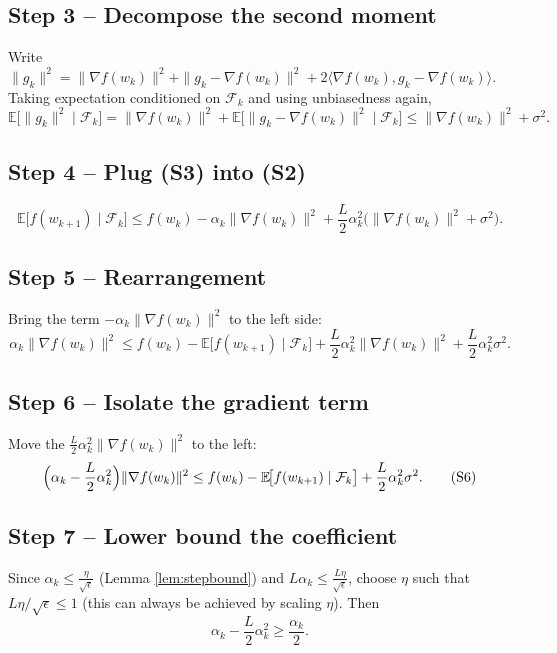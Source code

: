 \documentclass{article}
\newcommand{\E}{\mathbb{E}}
\begin{document}
\subsection*{Step 3 – Decompose the second moment}
Write $\|g_{k}\|^{2}= \|\nabla f(w_{k})\|^{2}+ \|g_{k}-\nabla f(w_{k})\|^{2}+2\langle\nabla f(w_{k}),g_{k}-\nabla f(w_{k})\rangle$.
Taking expectation conditioned on $\mathcal{F}_{k}$ and using unbiasedness again,
\[
\E\!\big[\|g_{k}\|^{2}\mid\mathcal{F}_{k}\big]
=\|\nabla f(w_{k})\|^{2}+\E\!\big[\|g_{k}-\nabla f(w_{k})\|^{2}\mid\mathcal{F}_{k}\big]
\le \|\nabla f(w_{k})\|^{2}+\sigma^{2}.
\tag{S3}
\]

\subsection*{Step 4 – Plug (S3) into (S2)}
\[
\E\!\big[f(w_{k+1})\mid\mathcal{F}_{k}\big]
\le f(w_{k})-\alpha_{k}\|\nabla f(w_{k})\|^{2}
+\frac{L}{2}\alpha_{k}^{2}\big(\|\nabla f(w_{k})\|^{2}+\sigma^{2}\big).
\tag{S4}
\]

\subsection*{Step 5 – Rearrangement}
Bring the term $-\alpha_{k}\|\nabla f(w_{k})\|^{2}$ to the left side:
\[
\alpha_{k}\|\nabla f(w_{k})\|^{2}
\le f(w_{k})-\E\!\big[f(w_{k+1})\mid\mathcal{F}_{k}\big]
+\frac{L}{2}\alpha_{k}^{2}\|\nabla f(w_{k})\|^{2}
+\frac{L}{2}\alpha_{k}^{2}\sigma^{2}.
\tag{S5}
\]

\subsection*{Step 6 – Isolate the gradient term}
Move the $ \frac{L}{2}\alpha_{k}^{2}\|\nabla f(w_{k})\|^{2}$ to the left:
\[
\Bigl(\alpha_{k}-\frac{L}{2}\alpha_{k}^{2}\Bigr)\|\nabla f(w_{k})\|^{2}
\le f(w_{k})-\E\!\big[f(w_{k+1})\mid\mathcal{F}_{k}\big]
+\frac{L}{2}\alpha_{k}^{2}\sigma^{2}.
\tag{S6}
\]

\subsection*{Step 7 – Lower bound the coefficient}
Since $\alpha_{k}\le\frac{\eta}{\sqrt{\epsilon}}$ (Lemma \ref{lem:stepbound}) and $L\alpha_{k}\le \frac{L\eta}{\sqrt{\epsilon}}$, choose $\eta$ such that $L\eta/\sqrt{\epsilon}\le1$ (this can always be achieved by scaling $\eta$). Then
\[
\alpha_{k}-\frac{L}{2}\alpha_{k}^{2}
\ge \frac{\alpha_{k}}{2}.
\tag{S7}
\]
\end{document}
